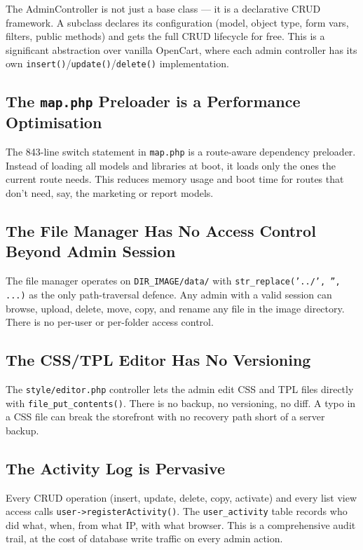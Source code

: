 \documentclass[11pt,a4paper]{article}
\begin{document}
The AdminController is not just a base class --- it is a declarative
CRUD framework. A subclass declares its configuration (model, object
type, form vars, filters, public methods) and gets the full CRUD
lifecycle for free. This is a significant abstraction over vanilla
OpenCart, where each admin controller has its own
\texttt{insert()}/\texttt{update()}/\texttt{delete()} implementation.

\subsection{The \texttt{map.php} Preloader is a Performance Optimisation}

The 843-line switch statement in \texttt{map.php} is a route-aware
dependency preloader. Instead of loading all models and libraries at
boot, it loads only the ones the current route needs. This reduces
memory usage and boot time for routes that don't need, say, the
marketing or report models.

\subsection{The File Manager Has No Access Control Beyond Admin Session}

The file manager operates on \texttt{DIR\_IMAGE/data/} with
\texttt{str\_replace('../', '', ...)} as the only path-traversal
defence. Any admin with a valid session can browse, upload, delete,
move, copy, and rename any file in the image directory. There is no
per-user or per-folder access control.

\subsection{The CSS/TPL Editor Has No Versioning}

The \texttt{style/editor.php} controller lets the admin edit CSS and
TPL files directly with \texttt{file\_put\_contents()}. There is no
backup, no versioning, no diff. A typo in a CSS file can break the
storefront with no recovery path short of a server backup.

\subsection{The Activity Log is Pervasive}

Every CRUD operation (insert, update, delete, copy, activate) and
every list view access calls \texttt{user->registerActivity()}. The
\texttt{user\_activity} table records who did what, when, from what
IP, with what browser. This is a comprehensive audit trail, at the
cost of database write traffic on every admin action.
\end{document}
